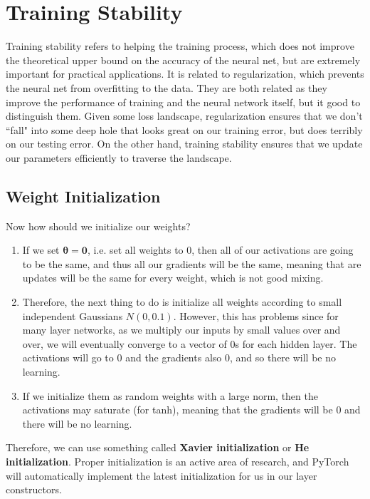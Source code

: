 \documentclass{article}
\theoremstyle{definition}
\theoremstyle{remark}
\theoremstyle{definition}
\begin{document}
\section{Training Stability}

Training stability refers to helping the training process, which does not improve the theoretical upper bound on the accuracy of the neural net, but are extremely important for practical applications. It is related to regularization, which prevents the neural net from overfitting to the data. They are both related as they improve the performance of training and the neural network itself, but it good to distinguish them. Given some loss landscape, regularization ensures that we don't ``fall" into some deep hole that looks great on our training error, but does terribly on our testing error. On the other hand, training stability ensures that we update our parameters efficiently to traverse the landscape. 

\subsection{Weight Initialization}

Now how should we initialize our weights? 
\begin{enumerate}
    \item If we set $\boldsymbol{\theta} = \mathbf{0}$, i.e. set all weights to $0$, then all of our activations are going to be the same, and thus all our gradients will be the same, meaning that are updates will be the same for every weight, which is not good mixing. 
    \item Therefore, the next thing to do is initialize all weights according to small independent Gaussians $N(0, 0.1)$. However, this has problems since for many layer networks, as we multiply our inputs by small values over and over, we will eventually converge to a vector of $0$s for each hidden layer. The activations will go to $0$ and the gradients also $0$, and so there will be no learning. 
    \item If we initialize them as random weights with a large norm, then the activations may saturate (for tanh), meaning that the gradients will be $0$ and there will be no learning. 
\end{enumerate}
Therefore, we can use something called \textbf{Xavier initialization} or \textbf{He initialization}. Proper initialization is an active area of research, and PyTorch will automatically implement the latest initialization for us in our layer constructors. 
\end{document}
